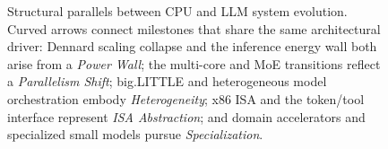 \begin{figure}[h]
{}%
    \caption{Structural parallels between CPU and LLM system evolution.
    Curved arrows connect milestones that share the same architectural driver:
    Dennard scaling collapse and the inference energy wall both arise from a \emph{Power Wall};
    the multi-core and MoE transitions reflect a \emph{Parallelism Shift};
    big.LITTLE and heterogeneous model orchestration embody \emph{Heterogeneity};
    x86 ISA and the token/tool interface represent \emph{ISA Abstraction};
    and domain accelerators and specialized small models pursue \emph{Specialization}.}
    \label{fig:paradigm_timeline}
    \end{figure}